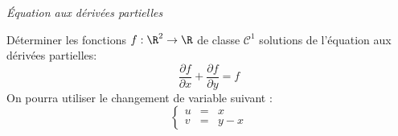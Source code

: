\documentclass[a4paper,10pt]{report}
\begin{document}
\medskip

\begin{center}
\textit{{ {\large Équation aux dérivées partielles}}}
\end{center}

\medskip



\begin{Exercice}{} Déterminer les fonctions $f : \R^{2} \rightarrow \R$ de classe $\mathcal{C}^{1}$ solutions de l'équation aux dérivées partielles:
  \[
  \frac{\partial f}{\partial x} + \frac{\partial f}{\partial y} = f
  \]
On pourra utiliser le changement de variable suivant :
  \[
  \left\lbrace\begin{array}{lll}
    u & = &  x \\
    v & = & y - x
  \end{array}\right.
  \]
\end{Exercice} 

\end{document}
